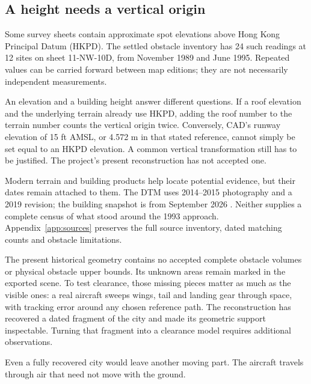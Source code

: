 \subsection*{A height needs a vertical origin}
Some survey sheets contain approximate spot elevations above Hong Kong Principal Datum (HKPD). The settled obstacle inventory has 24 such readings at 12 sites on sheet 11-NW-10D, from November 1989 and June 1995. Repeated values can be carried forward between map editions; they are not necessarily independent measurements.

An elevation and a building height answer different questions. If a roof elevation and the underlying terrain already use HKPD, adding the roof number to the terrain number counts the vertical origin twice. Conversely, CAD's runway elevation of 15 ft AMSL, or 4.572 m in that stated reference, cannot simply be set equal to an HKPD elevation. A common vertical transformation still has to be justified. The project's present reconstruction has not accepted one.

Modern terrain and building products help locate potential evidence, but their dates remain attached to them. The DTM uses 2014--2015 photography and a 2019 revision; the building snapshot is from September 2026 \citep{dtm,buildings}. Neither supplies a complete census of what stood around the 1993 approach. Appendix~\ref{app:sources} preserves the full source inventory, dated matching counts and obstacle limitations.

The present historical geometry contains no accepted complete obstacle volumes or physical obstacle upper bounds. Its unknown areas remain marked in the exported scene. To test clearance, those missing pieces matter as much as the visible ones: a real aircraft sweeps wings, tail and landing gear through space, with tracking error around any chosen reference path. The reconstruction has recovered a dated fragment of the city and made its geometric support inspectable. Turning that fragment into a clearance model requires additional observations.

Even a fully recovered city would leave another moving part. The aircraft travels through air that need not move with the ground.
